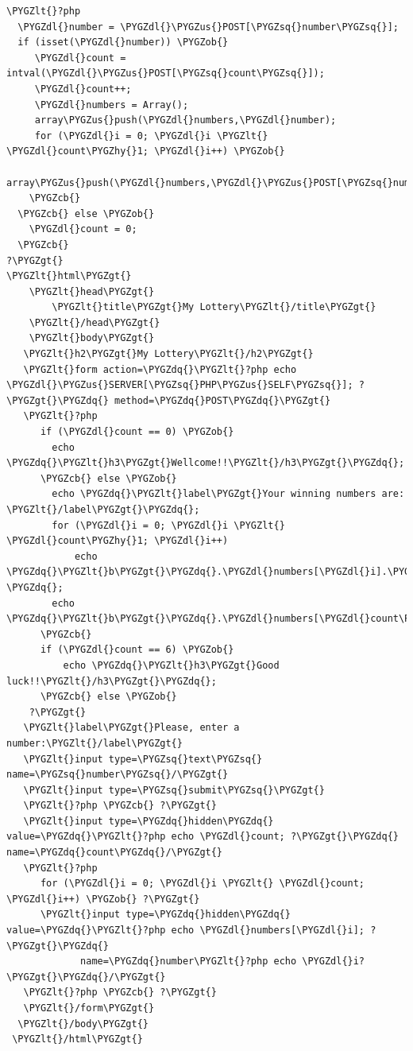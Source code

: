 \documentclass[a5paper,10pt,spanish]{sphinxmanual}
\def\PYGZus{\char`\_}
\def\PYGZob{\char`\{}
\def\PYGZcb{\char`\}}
\def\PYGZlt{\char`\<}
\def\PYGZgt{\char`\>}
\def\PYGZdl{\char`\$}
\def\PYGZhy{\char`\-}
\def\PYGZsq{\char`\'}
\def\PYGZdq{\char`\"}
\begin{document}
\begin{Verbatim}[commandchars=\\\{\}]
\PYGZlt{}?php
  \PYGZdl{}number = \PYGZdl{}\PYGZus{}POST[\PYGZsq{}number\PYGZsq{}];
  if (isset(\PYGZdl{}number)) \PYGZob{}
     \PYGZdl{}count = intval(\PYGZdl{}\PYGZus{}POST[\PYGZsq{}count\PYGZsq{}]);
     \PYGZdl{}count++;
     \PYGZdl{}numbers = Array();
     array\PYGZus{}push(\PYGZdl{}numbers,\PYGZdl{}number);
     for (\PYGZdl{}i = 0; \PYGZdl{}i \PYGZlt{} \PYGZdl{}count\PYGZhy{}1; \PYGZdl{}i++) \PYGZob{}
        array\PYGZus{}push(\PYGZdl{}numbers,\PYGZdl{}\PYGZus{}POST[\PYGZsq{}number\PYGZsq{}.\PYGZdl{}i]);
    \PYGZcb{}
  \PYGZcb{} else \PYGZob{}
    \PYGZdl{}count = 0;
  \PYGZcb{}
?\PYGZgt{}
\PYGZlt{}html\PYGZgt{}
    \PYGZlt{}head\PYGZgt{}
        \PYGZlt{}title\PYGZgt{}My Lottery\PYGZlt{}/title\PYGZgt{}
    \PYGZlt{}/head\PYGZgt{}
    \PYGZlt{}body\PYGZgt{}
   \PYGZlt{}h2\PYGZgt{}My Lottery\PYGZlt{}/h2\PYGZgt{}
   \PYGZlt{}form action=\PYGZdq{}\PYGZlt{}?php echo \PYGZdl{}\PYGZus{}SERVER[\PYGZsq{}PHP\PYGZus{}SELF\PYGZsq{}]; ?\PYGZgt{}\PYGZdq{} method=\PYGZdq{}POST\PYGZdq{}\PYGZgt{}
   \PYGZlt{}?php
      if (\PYGZdl{}count == 0) \PYGZob{}
        echo \PYGZdq{}\PYGZlt{}h3\PYGZgt{}Wellcome!!\PYGZlt{}/h3\PYGZgt{}\PYGZdq{};
      \PYGZcb{} else \PYGZob{}
        echo \PYGZdq{}\PYGZlt{}label\PYGZgt{}Your winning numbers are: \PYGZlt{}/label\PYGZgt{}\PYGZdq{};
        for (\PYGZdl{}i = 0; \PYGZdl{}i \PYGZlt{} \PYGZdl{}count\PYGZhy{}1; \PYGZdl{}i++)
            echo \PYGZdq{}\PYGZlt{}b\PYGZgt{}\PYGZdq{}.\PYGZdl{}numbers[\PYGZdl{}i].\PYGZdq{}\PYGZlt{}/b\PYGZgt{}, \PYGZdq{};
        echo \PYGZdq{}\PYGZlt{}b\PYGZgt{}\PYGZdq{}.\PYGZdl{}numbers[\PYGZdl{}count\PYGZhy{}1].\PYGZdq{}\PYGZlt{}/b\PYGZgt{}\PYGZlt{}/p\PYGZgt{}\PYGZdq{};
      \PYGZcb{}
      if (\PYGZdl{}count == 6) \PYGZob{}
          echo \PYGZdq{}\PYGZlt{}h3\PYGZgt{}Good luck!!\PYGZlt{}/h3\PYGZgt{}\PYGZdq{};
      \PYGZcb{} else \PYGZob{}
    ?\PYGZgt{}
   \PYGZlt{}label\PYGZgt{}Please, enter a number:\PYGZlt{}/label\PYGZgt{}
   \PYGZlt{}input type=\PYGZsq{}text\PYGZsq{} name=\PYGZsq{}number\PYGZsq{}/\PYGZgt{}
   \PYGZlt{}input type=\PYGZsq{}submit\PYGZsq{}\PYGZgt{}
   \PYGZlt{}?php \PYGZcb{} ?\PYGZgt{}
   \PYGZlt{}input type=\PYGZdq{}hidden\PYGZdq{} value=\PYGZdq{}\PYGZlt{}?php echo \PYGZdl{}count; ?\PYGZgt{}\PYGZdq{} name=\PYGZdq{}count\PYGZdq{}/\PYGZgt{}
   \PYGZlt{}?php
      for (\PYGZdl{}i = 0; \PYGZdl{}i \PYGZlt{} \PYGZdl{}count; \PYGZdl{}i++) \PYGZob{} ?\PYGZgt{}
      \PYGZlt{}input type=\PYGZdq{}hidden\PYGZdq{} value=\PYGZdq{}\PYGZlt{}?php echo \PYGZdl{}numbers[\PYGZdl{}i]; ?\PYGZgt{}\PYGZdq{}
             name=\PYGZdq{}number\PYGZlt{}?php echo \PYGZdl{}i?\PYGZgt{}\PYGZdq{}/\PYGZgt{}
   \PYGZlt{}?php \PYGZcb{} ?\PYGZgt{}
   \PYGZlt{}/form\PYGZgt{}
  \PYGZlt{}/body\PYGZgt{}
 \PYGZlt{}/html\PYGZgt{}
\end{Verbatim}
\end{document}

